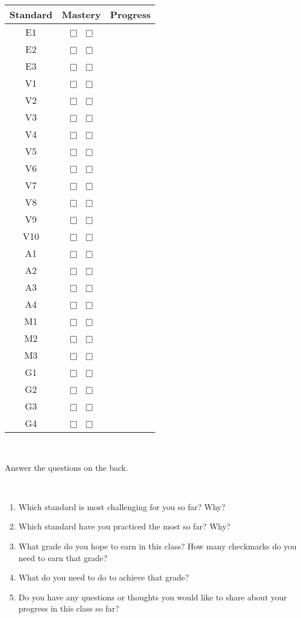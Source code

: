 \documentclass[letterpaper]{article}
\newcommand{\boxes}{\(\Box\) \(\Box\)}
\begin{document}
\hfill
\begin{tabular}{|c|c|c|} \hline
Standard & Mastery & Progress \\ \hline
E1 & \boxes &   \\  \hline
E2 & \boxes &   \\  \hline
E3 & \boxes &   \\  \hline
V1 & \boxes &   \\  \hline
V2 & \boxes &   \\  \hline
V3 & \boxes &  \\  \hline
V4 & \boxes & \\  \hline
V5 & \boxes &  \\  \hline
V6 & \boxes &  \\  \hline
V7 & \boxes &  \\  \hline
V8 & \boxes &  \\  \hline
V9 & \boxes &  \\  \hline
%
V10 & \boxes & \\  \hline
A1& \boxes & \\  \hline
A2 & \boxes &  \\  \hline
A3 & \boxes &  \\  \hline
A4 & \boxes &  \\  \hline
M1 & \boxes &  \\  \hline
M2 & \boxes &  \\  \hline
M3 & \boxes &  \\  \hline
G1 & \boxes &  \\  \hline
G2 & \boxes &  \\  \hline
G3 & \boxes &  \\  \hline
G4 & \boxes &  \\  \hline
\end{tabular}
\hfill
\hfill

\ \\

\vspace{0.1in}

Answer the questions on the back.

\newpage
\ \\

\vspace{0.2in}

\begin{enumerate}
\setlength{\itemsep}{1.6in}
\item Which standard is most challenging for you so far? Why?
\item Which standard have you practiced the most so far? Why?
\item What grade do you hope to earn in this class? How many checkmarks do you need to earn that grade?
\item What do you need to do to achieve that grade?
\item Do you have any questions or thoughts you would like to share about your progress in this class so far?
\end{enumerate}
  
\end{document}
